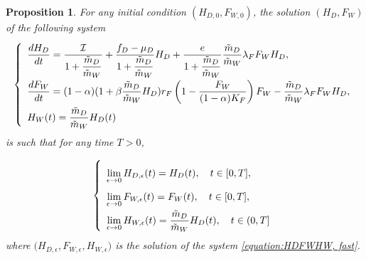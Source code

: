 \documentclass{article}
\newcommand{\lfw}{\lambda_{F}}
\newcommand{\lfw}{\lambda_{F}}
\newcommand{\cI}{\mathcal{I}}
\newcommand{\mW}{\tilde{m}_W}
\newcommand{\mD}{\tilde{m}_D}
\newtheorem{prop}[theorem]{Proposition}
\theoremstyle{definition}
\theoremstyle{remark}
\begin{document}
\begin{prop}
For any initial condition $(H_{D,0}, F_{W, 0})$, the solution $(H_D, F_W)$  of the following system
\begin{equation}
\def\arraystretch{2}
\left\lbrace \begin{array}{l}
\dfrac{dH_D}{dt} = \dfrac{\cI}{1+ \dfrac{\mD}{\mW}} + \dfrac{f_D - \mu_D}{1+\dfrac{\mD}{\mW}} H_D + \dfrac{e}{1+\dfrac{\mD}{\mW}} \dfrac{\mD}{\mW} \lfw F_WH_D, \\
\dfrac{dF_W}{dt} = (1-\alpha) (1+\beta \dfrac{\mD}{\mW} H_D) r_F \left(1 - \dfrac{F_W}{(1-\alpha)K_F} \right) F_W - \dfrac{\mD}{\mW} \lfw F_W H_D, \\
H_W(t) = \dfrac{\mD}{\mW} H_D(t)
\end{array} \right.
\label{equation:HDFW}
\end{equation} is such that for any time $T > 0$, 

\begin{equation*}
\def\arraystretch{2}
\left\lbrace \begin{array}{l}
\lim\limits_{ \epsilon \rightarrow 0}{H_{D, \epsilon}(t)} = H_D(t), \quad t \in [0,T], \\
\lim\limits_{ \epsilon \rightarrow 0} F_{W,  \epsilon}(t) = F_W(t),\quad t \in [0,T], \\
 \lim\limits_{ \epsilon \rightarrow 0} H_{W,  \epsilon}(t) = \dfrac{\mD}{\mW} H_D(t), \quad  t\in (0,T] \\
\end{array} \right.
\end{equation*}
where $\Big(H_{D, \epsilon}, F_{W,  \epsilon}, H_{W,  \epsilon} \Big)$ is the solution of the system \eqref{equation:HDFWHW, fast}.

\end{prop}
\end{document}
